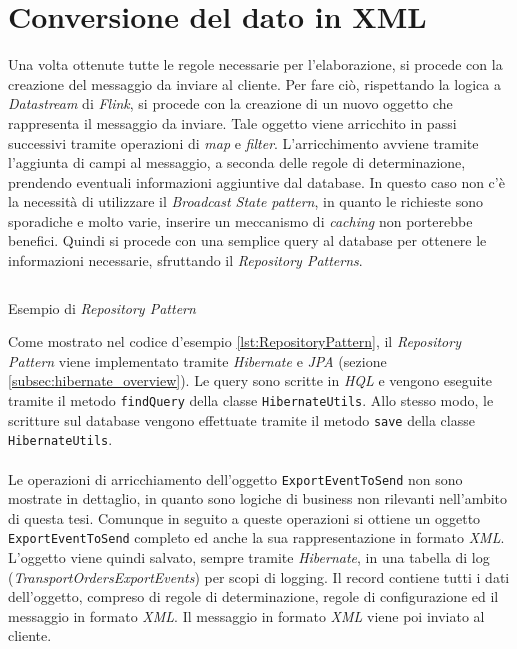 \section{Conversione del dato in XML}
\label{sec:ConversioneDelDatoInXML}
Una volta ottenute tutte le regole necessarie per l'elaborazione, si procede con la creazione del messaggio da inviare al cliente.
Per fare ciò, rispettando la logica a \textit{Datastream} di \textit{Flink}, si procede con la creazione di un nuovo oggetto che rappresenta il messaggio da inviare.
Tale oggetto viene arricchito in passi successivi tramite operazioni di \textit{map} e \textit{filter}.
L'arricchimento avviene tramite l'aggiunta di campi al messaggio, a seconda delle regole di determinazione, prendendo eventuali informazioni aggiuntive dal database.
In questo caso non c'è la necessità di utilizzare il \textit{Broadcast State pattern}, in quanto le richieste sono sporadiche e molto varie,
inserire un meccanismo di \textit{caching} non porterebbe benefici.
Quindi si procede con una semplice query al database per ottenere le informazioni necessarie, sfruttando il \textit{Repository Patterns}.
\begin{code}
    \inputminted[linenos,fontsize=\footnotesize]{java}{listings/EventsExport/RepositoryPattern.java}
    \caption{Esempio di \textit{Repository Pattern}}
    \label{lst:RepositoryPattern}
\end{code}
Come mostrato nel codice d'esempio \ref{lst:RepositoryPattern}, il \textit{Repository Pattern} viene implementato tramite \textit{Hibernate} e \textit{JPA} (sezione \ref{subsec:hibernate_overview}).
Le query sono scritte in \textit{HQL} e vengono eseguite tramite il metodo \texttt{findQuery} della classe \texttt{HibernateUtils}.
Allo stesso modo, le scritture sul database vengono effettuate tramite il metodo \texttt{save} della classe \texttt{HibernateUtils}.\\\\
Le operazioni di arricchiamento dell'oggetto \texttt{ExportEventToSend} non sono mostrate in dettaglio, in quanto sono logiche di business non rilevanti nell'ambito di questa tesi.
Comunque in seguito a queste operazioni si ottiene un oggetto \texttt{ExportEventToSend} completo ed anche la sua rappresentazione in formato \textit{XML}.
L'oggetto viene quindi salvato, sempre tramite \textit{Hibernate}, in una tabella di log (\textit{TransportOrdersExportEvents}) per scopi di logging.
Il record contiene tutti i dati dell'oggetto, compreso di regole di determinazione, regole di configurazione ed il messaggio in formato \textit{XML}.
Il messaggio in formato \textit{XML} viene poi inviato al cliente.

